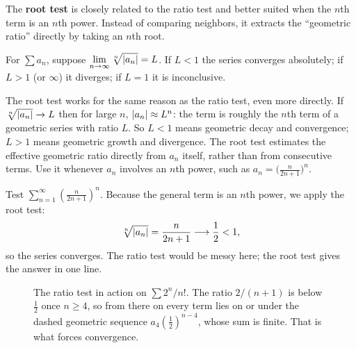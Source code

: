 The \textbf{root test} is closely related to the ratio test and better suited when the $n$th term is an $n$th power. Instead of comparing neighbors, it extracts the ``geometric ratio'' directly by taking an $n$th root.

\begin{theorem}
\label{ch29:thm-root}
For $\sum a_n$, suppose $\displaystyle\lim_{n\to\infty}\sqrt[n]{\lvert a_n\rvert} = L$. If $L<1$ the series converges absolutely; if $L>1$ (or $\infty$) it diverges; if $L=1$ it is inconclusive.
\end{theorem}

\begin{whybox}
The root test works for the same reason as the ratio test, even more directly. If $\sqrt[n]{\lvert a_n\rvert}\to L$ then for large $n$, $\lvert a_n\rvert\approx L^n$: the term is roughly the $n$th term of a geometric series with ratio $L$. So $L<1$ means geometric decay and convergence; $L>1$ means geometric growth and divergence. The root test estimates the effective geometric ratio directly from $a_n$ itself, rather than from consecutive terms. Use it whenever $a_n$ involves an $n$th power, such as $a_n = \big(\tfrac{n}{2n+1}\big)^n$.
\end{whybox}

\begin{example}
Test $\displaystyle\sum_{n=1}^\infty \left(\frac{n}{2n+1}\right)^n$. Because the general term is an $n$th power, we apply the root test:
\[
\sqrt[n]{\lvert a_n\rvert} = \frac{n}{2n+1} \longrightarrow \frac12 < 1,
\]
so the series converges. The ratio test would be messy here; the root test gives the answer in one line.
\end{example}

\begin{figure}[H]
\centering
{}
\caption{The ratio test in action on $\sum 2^n/n!$. The ratio $2/(n+1)$ is below $\tfrac12$ once $n\ge 4$, so from there on every term lies on or under the dashed geometric sequence $a_4\left(\tfrac12\right)^{n-4}$, whose sum is finite. That is what forces convergence.}
\label{ch29:fig-ratio}
\end{figure}

